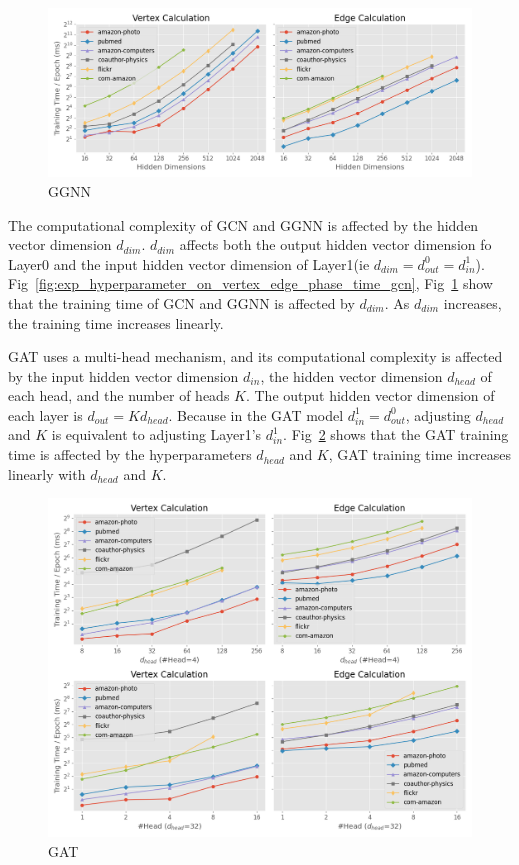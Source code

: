 \begin{figure}
    \centering
    \includegraphics[width=0.7\columnwidth]{figs/experiments/exp_hyperparameter_on_vertex_edge_phase_time_ggnn.png}
    \caption{GGNN}
    \label{fig:exp_hyperparameter_on_vertex_edge_phase_time_ggnn}
\end{figure}

The computational complexity of GCN and GGNN is affected by the hidden vector dimension $d_{dim}$. $d_{dim}$ affects both the output hidden vector dimension fo Layer0 and
the input hidden vector dimension of Layer1(ie $d_{dim} = d^0_{out} = d^1_{in}$). Fig~\ref{fig:exp_hyperparameter_on_vertex_edge_phase_time_gcn}, Fig~\ref{fig:exp_hyperparameter_on_vertex_edge_phase_time_ggnn}
show that the training time of GCN and GGNN is affected by $d_{dim}$. As $d_{dim}$ increases, the training time increases linearly.

GAT uses a multi-head mechanism, and its computational complexity is affected by the input hidden vector dimension $d_{in}$, the hidden vector dimension $d_{head}$ of each head, and the number of heads $K$.
The output hidden vector dimension of each layer is $d_{out}=K d_{head}$.
Because in the GAT model $d^1_{in}=d^0_{out}$, adjusting $d_{head}$ and $K$ is equivalent to adjusting Layer1’s $d^1_{in}$.
Fig~\ref{fig:exp_hyperparameter_on_vertex_edge_phase_time_gat} shows that the GAT training time is affected by the hyperparameters $d_{head}$ and $K$, 
GAT training time increases linearly with $d_{head}$ and $K$.

\begin{figure}
    \centering
    \includegraphics[width=0.7\columnwidth]{figs/experiments/exp_hyperparameter_on_vertex_edge_phase_time_gat.png}
    \caption{GAT}
    \label{fig:exp_hyperparameter_on_vertex_edge_phase_time_gat}
\end{figure}

